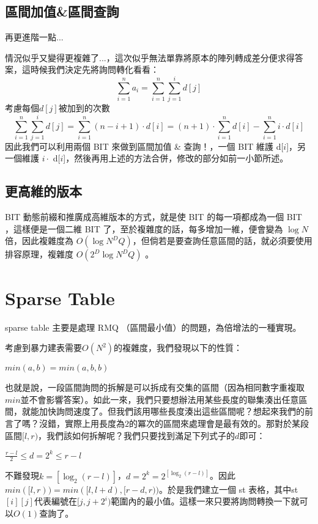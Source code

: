	\subsection{區間加值\&區間查詢}
	再更進階一點...
\par 情況似乎又變得更複雜了...，這次似乎無法單靠將原本的陣列轉成差分便求得答案，這時候我們決定先將詢問轉化看看：
$$\sum_{i=1}^{n} a_i = \sum_{i=1}^{n}\sum_{j=1}^{i} d[j]$$
考慮每個$d[j]$被加到的次數
$$\sum_{i=1}^{n}\sum_{j=1}^{i} d[j] = \sum_{i=1}^{n} (n-i+1) \cdot d[i] = (n+1) \cdot \sum_{i=1}^{n} d[i] - \sum_{i=1}^{n} i \cdot d[i]$$
因此我們可以利用兩個 BIT 來做到區間加值 \& 查詢！，一個 BIT 維護 d[$i$]，另一個維護 $i \cdot$ d[$i$]，然後再用上述的方法合併，修改的部分如前一小節所述。
	\subsection{更高維的版本}
	BIT 動態前綴和推廣成高維版本的方式，就是使 BIT 的每一項都成為一個 BIT ，這樣便是一個二維 BIT 了，至於複雜度的話，每多增加一維，便會變為 $\log{N}$ 倍，因此複雜度為 $O(\log{N}^DQ)$，但倘若是要查詢任意區間的話，就必須要使用排容原理，複雜度 $O(2^D\log{N}^DQ)$ 。
	
\section{Sparse Table}
sparse table 主要是處理 RMQ （區間最小值）的問題，為倍增法的一種實現。

考慮到暴力建表需要$O(N^2)$的複雜度，我們發現以下的性質：
\begin{center}
$min(a,b)=min(a,b,b)$\\
\end{center}
也就是說，一段區間詢問的拆解是可以拆成有交集的區間（因為相同數字重複取$min$並不會影響答案）。如此一來，我們只要想辦法用某些長度的聯集湊出任意區間，就能加快詢問速度了。但我們該用哪些長度湊出這些區間呢？想起來我們的前言了嗎？沒錯，實際上用長度為$2$的冪次的區間來處理會是最有效的。那對於某段區間$[l,r)$，我們該如何拆解呢？我們只要找到滿足下列式子的$d$即可：
\begin{center}
$\frac{r-l}{2} \leq d=2^k\leq r-l$
\end{center}
不難發現$k=[\log _2 (r-l)]$，$d=2^k =2^[\log _2 (r-l)]$。因此$min([l,r))=min([l,l+d),[r-d,r))$。於是我們建立一個 st 表格，其中st$[i][j]$代表編號在$[j,j+2^i)$範圍內的最小值。這樣一來只要將詢問轉換一下就可以$O(1)$查詢了。
